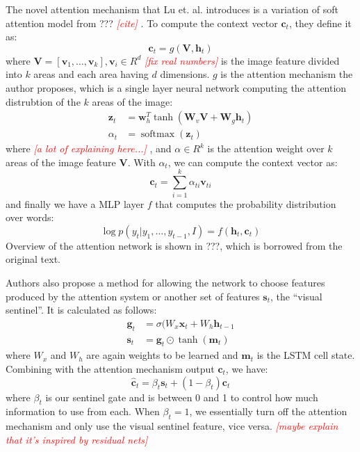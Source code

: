 \documentclass[10pt,twocolumn,letterpaper]{article}
\newcommand{\todo}[1]{\textcolor{red}{{\em [#1]}} }
\newcommand{\matr}[1]{\mathbf{#1}}
\newcommand{\bfit}[1]{\mathbf{\mathit{#1}}}
\newcommand{\bs}[1]{\boldsymbol{#1}}
\begin{document}
The novel attention mechanism that Lu et. al. introduces is a variation of
soft attention model from ??? \todo{cite}. To compute the context vector
$\bs{c}_t$, they define it as:
%
\begin{equation}
  \bs{c}_t = g(\matr{V}, \bs{h}_t)
\end{equation}
%
where $\matr{V} = [\mathbf{v}_1,\dots,\mathbf{v}_k], \mathbf{v}_i \in R^d$
\todo{fix real numbers} is the image feature divided into $k$ areas and each
area having $d$ dimensions. $g$ is the attention mechanism the author
proposes, which is a single layer neural network computing the attention
distrubtion of the $k$ areas of the image:
%
\begin{align}
  \matr{z}_t &= \matr{w}_h^T \tanh(\matr{W}_v \matr{V} + \matr{W}_g \matr{h}_t) \\
  \alpha_t   &= \operatorname{softmax}(\matr{z}_t)
\end{align}
%
where \todo{a lot of explaining here...}, and $\alpha \in R^k$ is the
attention weight over $k$ areas of the image feature $\matr{V}$. With
$\alpha_t$, we can compute the context vector as:
%
\begin{equation}
  \bs{c}_t = \sum_{i=1}^k \alpha_{ti} \bs{v}_{ti}
\end{equation}
%
and finally we have a MLP layer $f$ that computes the probability distribution
over words:
%
\begin{equation}
  \log p(y_t | y_1,\dots,y_{t-1},I) = f(\bs{h}_t, \bs{c}_t)
\end{equation}
%
Overview of the attention network is shown in ???, which is borrowed from the
original text.

Authors also propose a method for allowing the network to choose features
produced by the attention system or another set of features
$\bs{s}_t$, the ``visual sentinel''. It is calculated as follows:
%
\begin{align}
  \bs{g}_t &= \sigma (\bfit{W}_x \bs{x}_t + \bfit{W}_h \bs{h}_{t-1} \\
  \bs{s}_t &= \bs{g}_t \odot \tanh (\bs{m}_t)
\end{align}
%
where $\bfit{W}_x$ and $\bfit{W}_h$ are again weights to be learned and
$\bs{m}_t$ is the LSTM cell state. Combining with the attention
mechanism output $\bs{c}_t$, we have:
%
\begin{equation}
  \hat{\bs{c}}_t = \beta_t \bs{s}_t + (1 - \beta_t) \bs{c}_t
\end{equation}
%
where $\beta_t$ is our sentinel gate and is between 0 and 1 to control how
much information to use from each. When $\beta_t=1$, we essentially turn
off the attention mechanism and only use the visual sentinel feature, vice
versa. \todo{maybe explain that it's inspired by residual nets}
\end{document}
